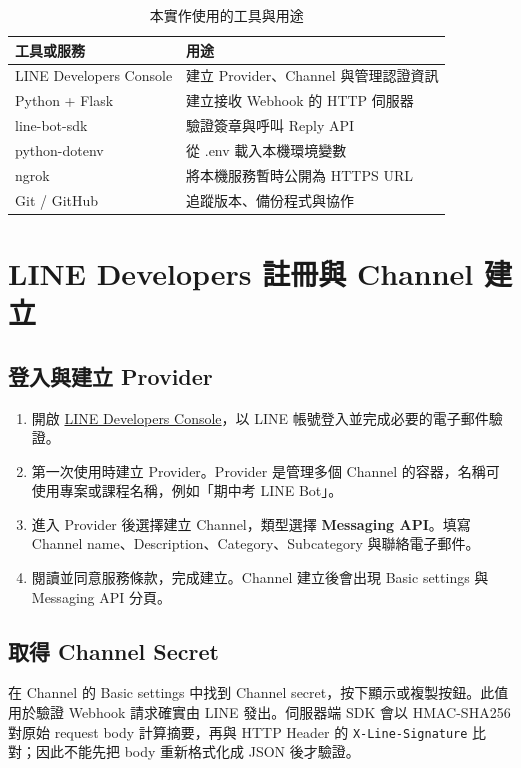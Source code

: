 \documentclass[12pt,a4paper]{report}
\begin{document}
\begin{table}[htbp]
\centering
\caption{本實作使用的工具與用途}
\label{tab:tools}
\begin{tabular}{p{4cm}p{8cm}}
\toprule
工具或服務 & 用途 \\
\midrule
LINE Developers Console & 建立 Provider、Channel 與管理認證資訊 \\
Python + Flask & 建立接收 Webhook 的 HTTP 伺服器 \\
line-bot-sdk & 驗證簽章與呼叫 Reply API \\
python-dotenv & 從 .env 載入本機環境變數 \\
ngrok & 將本機服務暫時公開為 HTTPS URL \\
Git / GitHub & 追蹤版本、備份程式與協作 \\
\bottomrule
\end{tabular}
\end{table}

\chapter{LINE Developers 註冊與 Channel 建立}
\section{登入與建立 Provider}
\begin{enumerate}
  \item 開啟 \href{https://developers.line.biz/}{LINE Developers Console}，以 LINE 帳號登入並完成必要的電子郵件驗證。
  \item 第一次使用時建立 Provider。Provider 是管理多個 Channel 的容器，名稱可使用專案或課程名稱，例如「期中考 LINE Bot」。
  \item 進入 Provider 後選擇建立 Channel，類型選擇 \textbf{Messaging API}。填寫 Channel name、Description、Category、Subcategory 與聯絡電子郵件。
  \item 閱讀並同意服務條款，完成建立。Channel 建立後會出現 Basic settings 與 Messaging API 分頁。
\end{enumerate}

\section{取得 Channel Secret}
在 Channel 的 Basic settings 中找到 Channel secret，按下顯示或複製按鈕。此值用於驗證 Webhook 請求確實由 LINE 發出。伺服器端 SDK 會以 HMAC-SHA256 對原始 request body 計算摘要，再與 HTTP Header 的 \texttt{X-Line-Signature} 比對；因此不能先把 body 重新格式化成 JSON 後才驗證。
\end{document}

